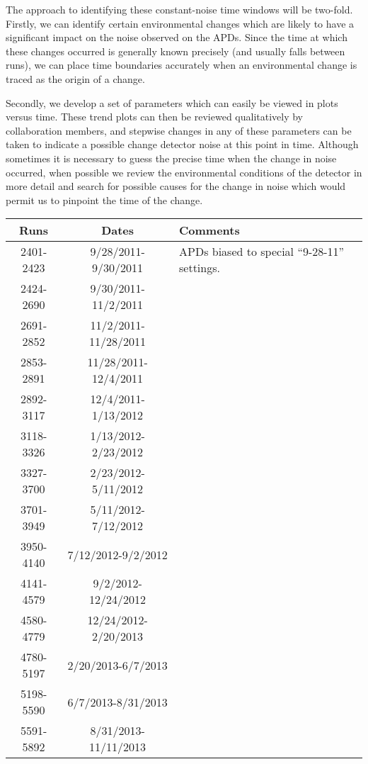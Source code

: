 The approach to identifying these constant-noise time windows will be two-fold.  Firstly, we can identify certain environmental changes which are likely to have a significant impact on the noise observed on the APDs.  Since the time at which these changes occurred is generally known precisely (and usually falls between runs), we can place time boundaries accurately when an environmental change is traced as the origin of a change.

Secondly, we develop a set of parameters which can easily be viewed in plots versus time.  These trend plots can then be reviewed qualitatively by collaboration members, and stepwise changes in any of these parameters can be taken to indicate a possible change detector noise at this point in time.  Although sometimes it is necessary to guess the precise time when the change in noise occurred, when possible we review the environmental conditions of the detector in more detail and search for possible causes for the change in noise which would permit us to pinpoint the time of the change.

\begin{table}
\begin{tabular}{|c|c|p{}|}\hline
Runs & Dates & Comments \\\hline
2401-2423 & 9/28/2011-9/30/2011 & APDs biased to special ``9-28-11'' settings. \\\hline
2424-2690 & 9/30/2011-11/2/2011 &    \\\hline
2691-2852 & 11/2/2011-11/28/2011 & \\\hline
2853-2891 & 11/28/2011-12/4/2011 & \\\hline
2892-3117 & 12/4/2011-1/13/2012 & \\\hline
3118-3326 & 1/13/2012-2/23/2012 & \\\hline
3327-3700 & 2/23/2012-5/11/2012 & \\\hline
3701-3949 & 5/11/2012-7/12/2012 & \\\hline
3950-4140 & 7/12/2012-9/2/2012 & \\\hline
4141-4579 & 9/2/2012-12/24/2012 & \\\hline
4580-4779 & 12/24/2012-2/20/2013 & \\\hline
4780-5197 & 2/20/2013-6/7/2013 & \\\hline
5198-5590 & 6/7/2013-8/31/2013 & \\\hline
5591-5892 & 8/31/2013-11/11/2013 & \\\hline
\end{tabular}
\end{table}







